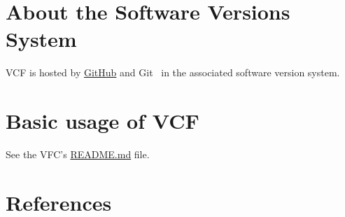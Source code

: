 \section{About the Software Versions System}

VCF is hosted by \href{https://github.com}{GitHub} and
Git~\cite{vruiz__GitHub} in the associated software version system.

\section{Basic usage of VCF}

See the VFC's \href{https://github.com/Sistemas-Multimedia/VCF/blob/main/README.md}{README.md} file.

\section{References}

\renewcommand{\addcontentsline}[3]{}%

